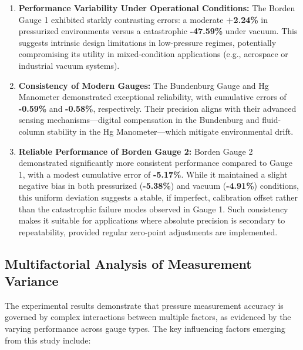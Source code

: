 \documentclass{article}
\begin{document}
\begin{enumerate}  
	\item \textbf{Performance Variability Under Operational Conditions:}  
	The Borden Gauge 1 exhibited starkly contrasting errors: a moderate \textbf{+2.24\%} in pressurized environments versus a catastrophic \textbf{-47.59\%} under vacuum. This suggests intrinsic design limitations in low-pressure regimes, potentially compromising its utility in mixed-condition applications (e.g., aerospace or industrial vacuum systems).  
	
	\item \textbf{Consistency of Modern Gauges:}  
	The Bundenburg Gauge and Hg Manometer demonstrated exceptional reliability, with cumulative errors of \textbf{-0.59\%} and \textbf{-0.58\%}, respectively. Their precision aligns with their advanced sensing mechanisms—digital compensation in the Bundenburg and fluid-column stability in the Hg Manometer—which mitigate environmental drift.  
	
	\item \textbf{Reliable Performance of Borden Gauge 2:}  
	Borden Gauge 2 demonstrated significantly more consistent performance compared to Gauge 1, with a modest cumulative error of \textbf{-5.17\%}. While it maintained a slight negative bias in both pressurized (\textbf{-5.38\%}) and vacuum (\textbf{-4.91\%}) conditions, this uniform deviation suggests a stable, if imperfect, calibration offset rather than the catastrophic failure modes observed in Gauge 1. Such consistency makes it suitable for applications where absolute precision is secondary to repeatability, provided regular zero-point adjustments are implemented.
\end{enumerate}  

\subsection{Multifactorial Analysis of Measurement Variance}
The experimental results demonstrate that pressure measurement accuracy is governed by complex interactions between multiple factors, as evidenced by the varying performance across gauge types. The key influencing factors emerging from this study include:
\end{document}
